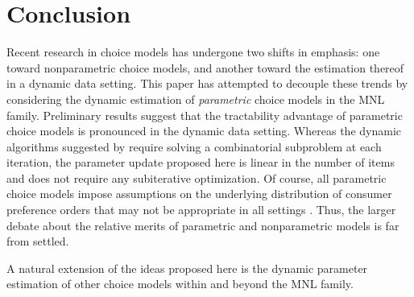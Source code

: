 \documentclass[preprint,12pt,authoryear]{elsarticle}
\begin{document}
\section{Conclusion}
Recent research in choice models has undergone two shifts in emphasis: one toward nonparametric choice models, and another toward the estimation thereof in a dynamic data setting. This paper has attempted to decouple these trends by considering the dynamic estimation of \emph{parametric} choice models in the MNL family. Preliminary results suggest that the tractability advantage of parametric choice models is pronounced in the dynamic data setting. Whereas the dynamic algorithms suggested by \cite{honguyen2021} require solving a combinatorial subproblem at each iteration, the parameter update proposed here is linear in the number of items and does not require any subiterative optimization. Of course, all parametric choice models impose assumptions on the underlying distribution of consumer preference orders that may not be appropriate in all settings \cite[][]{keane1997}. Thus, the larger debate about the relative merits of parametric and nonparametric models is far from settled.

A natural extension of the ideas proposed here is the dynamic parameter estimation of other choice models within and beyond the MNL family. 




\end{document}
